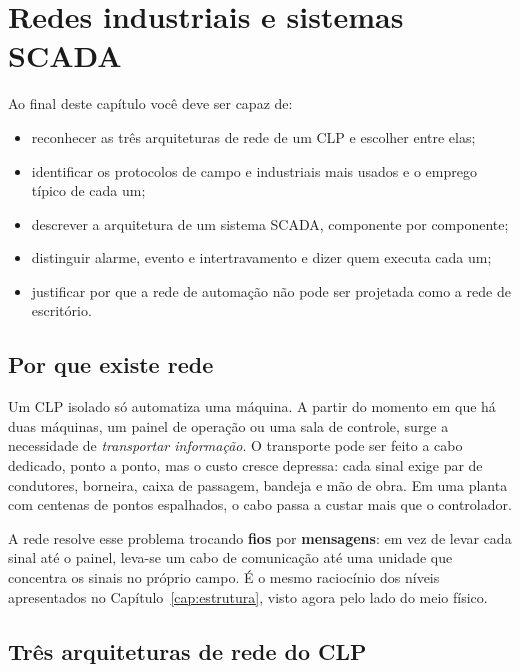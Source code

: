 \chapter{Redes industriais e sistemas SCADA}
\label{cap:redes-scada}

\begin{objetivos}
Ao final deste capítulo você deve ser capaz de:
\begin{itemize}
  \item reconhecer as três arquiteturas de rede de um CLP e escolher entre elas;
  \item identificar os protocolos de campo e industriais mais usados e o emprego típico de cada um;
  \item descrever a arquitetura de um sistema SCADA, componente por componente;
  \item distinguir alarme, evento e intertravamento e dizer quem executa cada um;
  \item justificar por que a rede de automação não pode ser projetada como a rede de escritório.
\end{itemize}
\end{objetivos}

\section{Por que existe rede}

Um CLP isolado só automatiza uma máquina. A partir do momento em que há duas máquinas, um painel de
operação ou uma sala de controle, surge a necessidade de \emph{transportar informação}. O transporte
pode ser feito a cabo dedicado, ponto a ponto, mas o custo cresce depressa: cada sinal exige par de
condutores, borneira, caixa de passagem, bandeja e mão de obra. Em uma planta com centenas de pontos
espalhados, o cabo passa a custar mais que o controlador.

A rede resolve esse problema trocando \textbf{fios} por \textbf{mensagens}: em vez de levar cada
sinal até o painel, leva-se um cabo de comunicação até uma unidade que concentra os sinais no próprio
campo. É o mesmo raciocínio dos níveis apresentados no Capítulo~\ref{cap:estrutura}, visto agora pelo
lado do meio físico.


\section{Três arquiteturas de rede do CLP}

